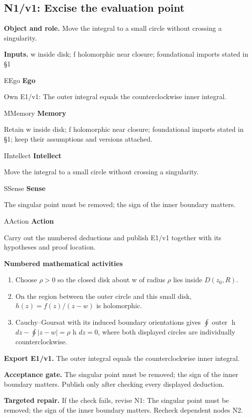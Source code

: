 \documentclass[preprint,12pt,aps,pra,showkeys,amsmath,amssymb,superscriptaddress,floatfix]{revtex4-2}
\theoremstyle{definition}
\theoremstyle{remark}
\newcommand{\mmfaculty}[3]{%
 \begin{mmfacultybox}{#1}{#2}
 {\sffamily\bfseries\color{MMBlue}#2}\par\smallskip #3
 \end{mmfacultybox}}
\newcommand{\field}[2]{\par\smallskip\noindent\textbf{#1.} #2\par}
\begin{document}
\subsection{N1/v1: Excise the evaluation point}

\field{Object and role}{Move the integral to a small circle without crossing a singularity.}

\field{Inputs}{w inside disk; f holomorphic near closure; foundational imports stated
in §1}

\mmfaculty{E}{Ego}{Own E1/v1: The outer integral equals the counterclockwise inner
integral.}

\mmfaculty{M}{Memory}{Retain w inside disk; f holomorphic near closure; foundational imports
stated in §1; keep their assumptions and versions attached.}

\mmfaculty{I}{Intellect}{Move the integral to a small circle without crossing a singularity.}

\mmfaculty{S}{Sense}{The singular point must be removed; the sign of the inner boundary
matters.}

\mmfaculty{A}{Action}{Carry out the numbered deductions and publish E1/v1 together with its
hypotheses and proof location.}

\smallskip\noindent\textbf{Numbered mathematical activities}

\begin{enumerate}[label=N1.\arabic*,leftmargin=3.4em]

\item Choose \(\rho >0\) so the closed disk about w of radius \(\rho\) lies
inside \(D(z_{0},R)\).

\item On the region between the outer circle and this small disk,
\(h(z)=f(z)/(z-w)\) is holomorphic.

\item Cauchy--Goursat with its induced boundary orientations gives
\(\oint \operatorname{outer}\) h \(dz-\oint |z-w|=\rho\) h \(dz=0\),
where both displayed circles are individually counterclockwise.

\end{enumerate}

\field{Export E1/v1}{The outer integral equals the counterclockwise inner integral.}

\field{Acceptance gate}{The singular point must be removed; the sign of the inner boundary
matters. Publish only after checking every displayed deduction.}

\field{Targeted repair}{If the check fails, revise N1: The singular point must be removed; the
sign of the inner boundary matters. Recheck dependent nodes N2.}
\end{document}
